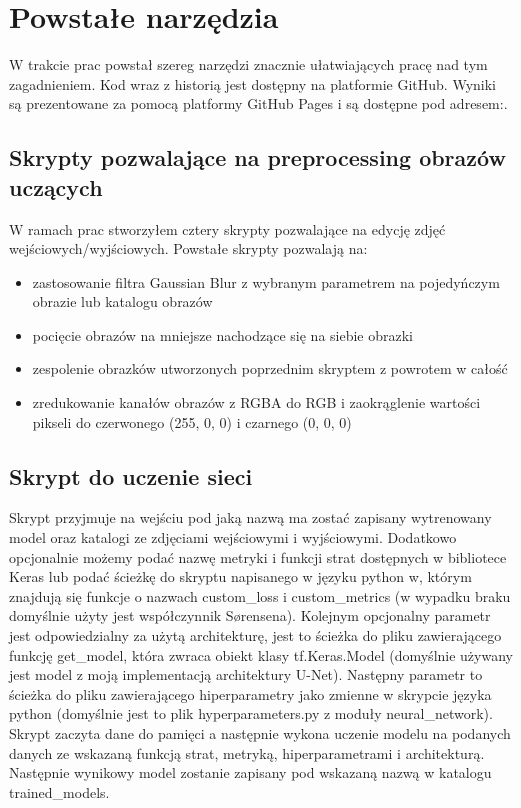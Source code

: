 \documentclass{article}
\begin{document}
\section{Powstałe narzędzia}
W trakcie prac powstał szereg narzędzi znacznie ułatwiających pracę nad tym zagadnieniem.
Kod wraz z historią jest dostępny na platformie GitHub.
Wyniki są prezentowane za pomocą platformy GitHub Pages i są dostępne pod adresem:.
\subsection{Skrypty pozwalające na preprocessing obrazów uczących}
W ramach prac stworzyłem cztery skrypty pozwalające na edycję zdjęć wejściowych/wyjściowych.
Powstałe skrypty pozwalają na:
\begin{itemize}
  \item zastosowanie filtra Gaussian Blur z wybranym parametrem na pojedyńczym obrazie lub katalogu obrazów
  \item pocięcie obrazów na mniejsze nachodzące się na siebie obrazki
  \item zespolenie obrazków utworzonych poprzednim skryptem z powrotem w całość
  \item zredukowanie kanałów obrazów z RGBA do RGB i zaokrąglenie wartości pikseli do czerwonego (255, 0, 0) i czarnego (0, 0, 0)
\end{itemize}
\subsection{Skrypt do uczenie sieci}
Skrypt przyjmuje na wejściu pod jaką nazwą ma zostać zapisany wytrenowany model oraz katalogi ze zdjęciami wejściowymi i wyjściowymi.
Dodatkowo opcjonalnie możemy podać nazwę metryki i funkcji strat dostępnych w bibliotece Keras lub podać ścieżkę do skryptu napisanego w języku python w, którym znajdują się funkcje o nazwach custom\_loss i custom\_metrics (w wypadku braku domyślnie użyty jest współczynnik Sørensena).
Kolejnym opcjonalny parametr jest odpowiedzialny za użytą architekturę, jest to ścieżka do pliku zawierającego funkcję get\_model, która zwraca obiekt klasy tf.Keras.Model (domyślnie używany jest model z moją implementacją architektury U-Net).
Następny parametr to ścieżka do pliku zawierającego hiperparametry jako zmienne w skrypcie języka python (domyślnie jest to plik hyperparameters.py z moduły neural\_network).
Skrypt zaczyta dane do pamięci a następnie wykona uczenie modelu na podanych danych ze wskazaną funkcją strat, metryką, hiperparametrami i architekturą.
Następnie wynikowy model zostanie zapisany pod wskazaną nazwą w katalogu trained\_models.
\end{document}
